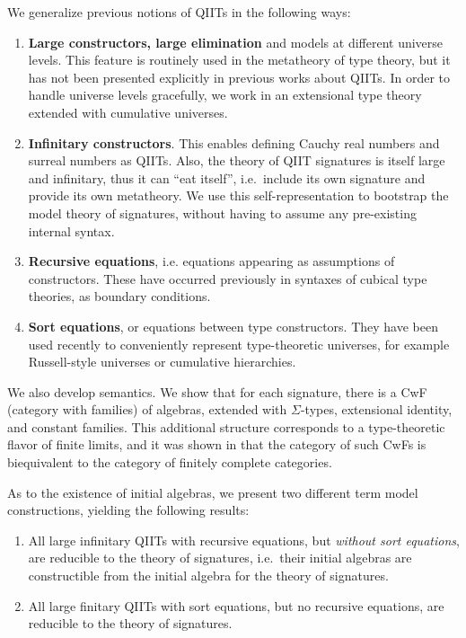 \documentclass{llncs}
\begin{document}
We generalize previous notions of QIITs in the following ways:
\begin{enumerate}
  \item
  \textbf{Large constructors, large elimination} and models at different
  universe levels. This feature is routinely used in the metatheory of type
  theory, but it has not been presented explicitly in previous works about
  QIITs. In order to handle universe levels gracefully, we work in an
  extensional type theory extended with cumulative universes.
  \item
  \textbf{Infinitary constructors}. This enables defining Cauchy real numbers
  and surreal numbers as QIITs. Also, the theory of QIIT signatures is itself
  large and infinitary, thus it can ``eat itself'', i.e.\ include its own
  signature and provide its own metatheory.  We use this self-representation to
  bootstrap the model theory of signatures, without having to assume any
  pre-existing internal syntax.
  \item
  \textbf{Recursive equations}, i.e. equations appearing as assumptions
  of constructors. These have occurred previously in syntaxes of cubical type
  theories, as boundary conditions.
  \item
  \textbf{Sort equations}, or equations between type constructors. They have
  been used recently to conveniently represent type-theoretic universes, for
  example Russell-style universes or cumulative hierarchies.
\end{enumerate}

We also develop semantics. We show that for each signature, there is a CwF
(category with families) of algebras, extended with $\Sigma$-types, extensional
identity, and constant families. This additional structure corresponds to a
type-theoretic flavor of finite limits, and it was shown in \cite{TODO} that the
category of such CwFs is biequivalent to the category of finitely complete
categories.

As to the existence of initial algebras, we present two different term model
constructions, yielding the following results:

\begin{enumerate}
\item
  All large infinitary QIITs with recursive equations, but \emph{without
  sort equations}, are reducible to the theory of signatures, i.e.\
  their initial algebras are constructible from the initial algebra for
  the theory of signatures.
\item
  All large finitary QIITs with sort equations, but no recursive equations,
  are reducible to the theory of signatures.
\end{enumerate}
\end{document}
